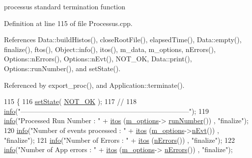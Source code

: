 processus standard termination function 

Definition at line 115 of file Processus.\+cpp.



References Data\+::build\+Histos(), close\+Root\+File(), elapsed\+Time(), Data\+::empty(), finalize(), ftos(), Object\+::info(), itos(), m\+\_\+data, m\+\_\+options, n\+Errors(), Options\+::n\+Errors(), Options\+::n\+Evt(), N\+O\+T\+\_\+\+OK, Data\+::print(), Options\+::run\+Number(), and set\+State().



Referenced by export\+\_\+proc(), and Application\+::terminate().


\begin{DoxyCode}
115                                     \{
116   \hyperlink{classProcessus_ad38cde0f1bcefa00b068e7947b8af927}{setState}( \hyperlink{classProcessus_a36278773bd98f2d5612fea40c7774821a629082f49d6e8df6b6da2b8fbb9d80fb}{NOT\_OK} );
117   \textcolor{comment}{// }
118   \hyperlink{classObject_a644fd329ea4cb85f54fa6846484b84a8}{info}(\textcolor{stringliteral}{"--------------------------------------------------------------------------"});
119   \hyperlink{classObject_a644fd329ea4cb85f54fa6846484b84a8}{info}(\textcolor{stringliteral}{"Processed Run Number       : "} + \hyperlink{Tools_8h_af330027dbdafb9a30768b3613c553e60}{itos} (\hyperlink{classProcessus_a74205f3c1e00c4448f7b3257c2351797}{m\_options}->
      \hyperlink{classOptions_a2d9447919fe90f9ce8df5530526cbb27}{runNumber}()) , \textcolor{stringliteral}{"finalize"});
120   \hyperlink{classObject_a644fd329ea4cb85f54fa6846484b84a8}{info}(\textcolor{stringliteral}{"Number of events processed : "} + \hyperlink{Tools_8h_af330027dbdafb9a30768b3613c553e60}{itos} (\hyperlink{classProcessus_a74205f3c1e00c4448f7b3257c2351797}{m\_options}->\hyperlink{classOptions_ad769b256263a4ac24dd6f989ae724ab7}{nEvt}())      , \textcolor{stringliteral}{"finalize"});
121   \hyperlink{classObject_a644fd329ea4cb85f54fa6846484b84a8}{info}(\textcolor{stringliteral}{"Number of Errors           : "} + \hyperlink{Tools_8h_af330027dbdafb9a30768b3613c553e60}{itos} (\hyperlink{classProcessus_a82a0487f82f07cc2c2dc2731f98149e7}{nErrors}())           , \textcolor{stringliteral}{"finalize"});  
122   \hyperlink{classObject_a644fd329ea4cb85f54fa6846484b84a8}{info}(\textcolor{stringliteral}{"Number of App errors       : "} + \hyperlink{Tools_8h_af330027dbdafb9a30768b3613c553e60}{itos} (\hyperlink{classProcessus_a74205f3c1e00c4448f7b3257c2351797}{m\_options}->
      \hyperlink{classOptions_acc6474323f0bbe17fa844e9a086b90b8}{nErrors}())   , \textcolor{stringliteral}{"finalize"});

\end{DoxyCode}
